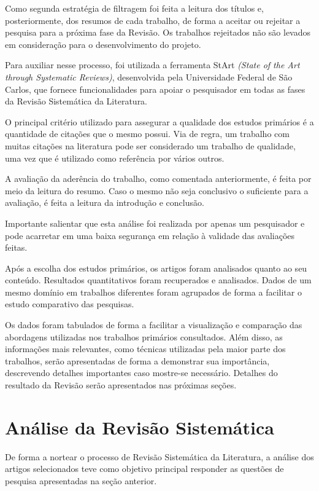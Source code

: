 \documentclass[12pt]{article}
\begin{document}
Como segunda estratégia de filtragem foi feita a leitura dos títulos e, posteriormente, dos resumos de cada trabalho, de forma a aceitar ou rejeitar a pesquisa para a próxima fase da Revisão. Os trabalhos rejeitados não são levados em consideração para o desenvolvimento do projeto.

Para auxiliar nesse processo, foi utilizada a ferramenta StArt  \emph{(State of the Art through Systematic Reviews)}, desenvolvida pela Universidade Federal de São Carlos, que fornece funcionalidades para apoiar o pesquisador em todas as fases da Revisão Sistemática da Literatura.

O principal critério utilizado para assegurar a qualidade dos estudos primários é a quantidade de citações que o mesmo possui. Via de regra, um trabalho com muitas citações na literatura pode ser considerado um trabalho de qualidade, uma vez que é utilizado como referência por vários outros. 

A avaliação da aderência do trabalho, como comentada anteriormente, é feita por meio da leitura do resumo. Caso o mesmo não seja conclusivo o suficiente para a avaliação, é feita a leitura da introdução e conclusão.

Importante salientar que esta análise foi realizada por apenas um pesquisador e pode acarretar em uma baixa segurança em relação à validade das avaliações feitas.

Após a escolha dos estudos primários, os artigos foram analisados quanto ao seu conteúdo. Resultados quantitativos foram recuperados e analisados. Dados de um mesmo domínio em trabalhos diferentes foram agrupados de forma a facilitar o estudo comparativo das pesquisas. 

Os dados foram  tabulados de forma a facilitar a visualização e comparação das abordagens utilizadas nos trabalhos primários consultados. Além disso, as informações mais relevantes, como técnicas utilizadas pela maior parte dos trabalhos, serão apresentadas de forma a demonstrar sua importância, descrevendo detalhes importantes caso mostre-se necessário. Detalhes do resultado da Revisão serão apresentados nas próximas seções.

\section{Análise da Revisão Sistemática}
De forma a nortear o processo de Revisão Sistemática da Literatura, a análise dos artigos selecionados teve como objetivo principal responder as questões de pesquisa apresentadas na seção anterior. 
\end{document}
